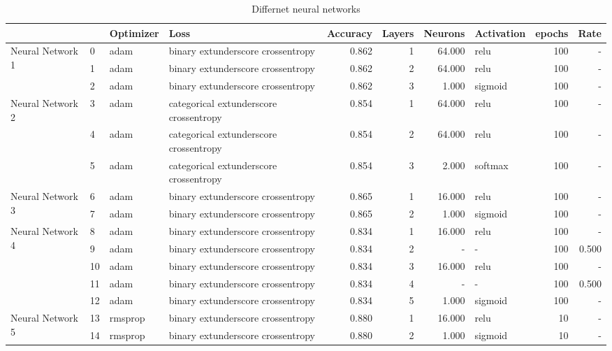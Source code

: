 \begin{table}[h!]
\caption{Differnet neural networks}
\label{tab:RawData}
\begin{tabular}{llllrrrlrr}
\toprule
 &  & Optimizer & Loss & Accuracy & Layers & Neurons & Activation & epochs & Rate \\
\midrule
\multirow[t]{3}{*}{Neural Network 1} & 0 & adam & binary	extunderscore crossentropy & 0.862 & 1 & 64.000 & relu & 100 & - \\
 & 1 & adam & binary	extunderscore crossentropy & 0.862 & 2 & 64.000 & relu & 100 & - \\
 & 2 & adam & binary	extunderscore crossentropy & 0.862 & 3 & 1.000 & sigmoid & 100 & - \\
\cline{1-10}
\multirow[t]{3}{*}{Neural Network 2} & 3 & adam & categorical	extunderscore crossentropy & 0.854 & 1 & 64.000 & relu & 100 & - \\
 & 4 & adam & categorical	extunderscore crossentropy & 0.854 & 2 & 64.000 & relu & 100 & - \\
 & 5 & adam & categorical	extunderscore crossentropy & 0.854 & 3 & 2.000 & softmax & 100 & - \\
\cline{1-10}
\multirow[t]{2}{*}{Neural Network 3} & 6 & adam & binary	extunderscore crossentropy & 0.865 & 1 & 16.000 & relu & 100 & - \\
 & 7 & adam & binary	extunderscore crossentropy & 0.865 & 2 & 1.000 & sigmoid & 100 & - \\
\cline{1-10}
\multirow[t]{5}{*}{Neural Network 4} & 8 & adam & binary	extunderscore crossentropy & 0.834 & 1 & 16.000 & relu & 100 & - \\
 & 9 & adam & binary	extunderscore crossentropy & 0.834 & 2 & - & - & 100 & 0.500 \\
 & 10 & adam & binary	extunderscore crossentropy & 0.834 & 3 & 16.000 & relu & 100 & - \\
 & 11 & adam & binary	extunderscore crossentropy & 0.834 & 4 & - & - & 100 & 0.500 \\
 & 12 & adam & binary	extunderscore crossentropy & 0.834 & 5 & 1.000 & sigmoid & 100 & - \\
\cline{1-10}
\multirow[t]{2}{*}{Neural Network 5} & 13 & rmsprop & binary	extunderscore crossentropy & 0.880 & 1 & 16.000 & relu & 10 & - \\
 & 14 & rmsprop & binary	extunderscore crossentropy & 0.880 & 2 & 1.000 & sigmoid & 10 & - \\
\cline{1-10}
\bottomrule
\end{tabular}
\end{table}
